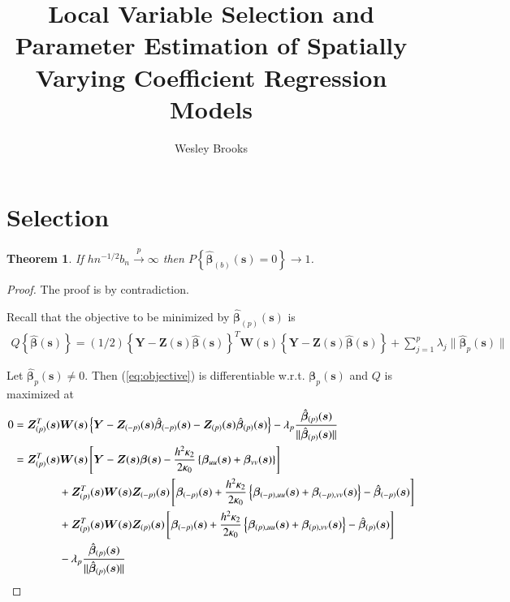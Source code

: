 \documentclass[authoryear, review, 11pt]{elsarticle}
\title{Local Variable Selection and Parameter Estimation of Spatially Varying Coefficient Regression Models}
\author{Wesley Brooks}
\date{}                                           %
\newtheorem{theorem}{Theorem}[section]
\begin{document}
    \section{Selection}
    
    \begin{theorem}\label{theorem:selection}   
        If $h n^{-1/2} b_n \xrightarrow{p} \infty$ then $P \left\{ \hat{\bm{\beta}}_{(b)} (\bm{s}) = 0 \right\} \to 1$.
    \end{theorem}

    \begin{proof}
        The proof is by contradiction.
      
        Recall that the objective to be minimized by $\hat{\bm{\beta}}_{(p)} (\bm{s})$ is
        \begin{align}\label{eq:objective}
            Q \left\{ \hat{\bm{\beta}} (\bm{s}) \right\} = (1/2) \left\{ \bm{Y} - \bm{Z}(\bm{s}) \hat{\bm{\beta}} (\bm{s}) \right\}^T \bm{W}(\bm{s}) \left\{ \bm{Y} - \bm{Z}(\bm{s}) \hat{\bm{\beta}} (\bm{s}) \right\} + \sum_{j=1}^p \lambda_j \| \hat{\bm{\beta}}_p (\bm{s}) \|
        \end{align}

        Let $\hat{\bm{\beta}}_p(\bm{s}) \ne 0$. Then (\ref{eq:objective}) is differentiable w.r.t. $\bm{\beta}_p(\bm{s})$ and $Q$ is maximized at
        \begin{align}
            0 &= \bm{Z}_{(p)}^T(\bm{s}) \bm{W}(\bm{s}) \left\{ \bm{Y} - \bm{Z}_{(-p)}(\bm{s}) \hat{\bm{\beta}}_{(-p)}(\bm{s}) - \bm{Z}_{(p)}(\bm{s}) \hat{\bm{\beta}}_{(p)}(\bm{s}) \right\} - \lambda_p \frac{ \hat{\bm{\beta}}_{(p)}(\bm{s}) }{\| \hat{\bm{\beta}}_{(p)}(\bm{s}) \|} \notag \\
            &= \bm{Z}_{(p)}^T(\bm{s}) \bm{W}(\bm{s}) \left[ \bm{Y} - \bm{Z}(\bm{s}) \bm{\beta}(\bm{s}) - \frac{h^2 \kappa_2}{2 \kappa_0} \left\{ \bm{\beta}_{uu}(\bm{s}) + \bm{\beta}_{vv}(\bm{s}) \right\} \right] \notag \\
            &\mkern+72mu+ \bm{Z}_{(p)}^T(\bm{s}) \bm{W}(\bm{s}) \bm{Z}_{(-p)}(\bm{s}) \left[ \bm{\beta}_{(-p)}(\bm{s}) + \frac{h^2 \kappa_2}{2 \kappa_0} \left\{ \bm{\beta}_{(-p),uu}(\bm{s}) + \bm{\beta}_{(-p),vv}(\bm{s}) \right\} - \hat{\bm{\beta}}_{(-p)}(\bm{s}) \right] \notag \\
            &\mkern+72mu+ \bm{Z}_{(p)}^T(\bm{s}) \bm{W}(\bm{s}) \bm{Z}_{(p)}(\bm{s}) \left[ \bm{\beta}_{(-p)}(\bm{s}) + \frac{h^2 \kappa_2}{2 \kappa_0} \left\{ \bm{\beta}_{(p),uu}(\bm{s}) + \bm{\beta}_{(p),vv}(\bm{s}) \right\} - \hat{\bm{\beta}}_{(p)}(\bm{s}) \right]  \notag \\
            &\mkern+72mu- \lambda_p \frac{ \hat{\bm{\beta}}_{(p)}(\bm{s}) }{\| \hat{\bm{\beta}}_{(p)}(\bm{s}) \|} \notag \\
        \end{align}
        

\end{proof}
\end{document}
